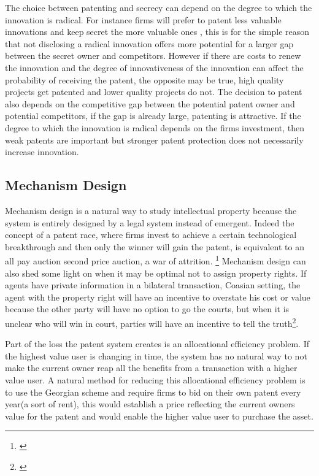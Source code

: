\documentclass[12pt]{article}
\numberwithin{equation}{section}
\begin{document}
The choice between patenting and secrecy can depend on the degree to which the innovation is radical. For instance firms will prefer to patent less valuable innovations and keep secret the more valuable ones \cite{Anton2004} , this is for the simple reason that not disclosing a radical innovation offers more potential for a larger gap between the secret owner and competitors. However if there are costs to renew the innovation and the degree of innovativeness of the innovation can affect the probability of receiving the patent, the opposite may be true, high quality projects get patented and lower quality projects do not\cite{Mose2011}. The decision to patent also depends on the competitive gap between the potential patent owner and potential competitors, if the gap is already large, patenting is attractive. If the degree to which the innovation is radical depends on the firms investment, then weak patents are important but stronger patent protection does not necessarily increase innovation\cite{Kultti2006}. %



\subsection{Mechanism Design}

Mechanism design is a natural way to study intellectual property because the system is entirely designed by a legal system instead of emergent. Indeed the concept of a patent race, where firms invest to achieve a certain technological breakthrough and then only the winner will gain the patent, is equivalent to an all pay auction second price auction, a war of attrition. \footnote{ \cite{Games2003} } Mechanism design can also shed some light on when it may be optimal not to assign property rights. If agents have private information in a bilateral transaction, Coasian setting, the agent with the property right will have an incentive to overstate his cost or value because the other party will have no option to go the courts, but when it is unclear who will win in court, parties will have an incentive to tell the truth\footnote{\cite{schmitz2001coase}}.

Part of the loss the patent system creates is an allocational efficiency problem. If the highest value user is changing in time, the system has no natural way to not make the current owner reap all the benefits from a transaction with a higher value user. A natural method for reducing this allocational efficiency problem is to use the Georgian scheme and require firms to bid on their own patent every year(a sort of rent), this would establish a price reflecting the current owners value for the patent and would enable the higher value user to purchase the asset.
\end{document}
